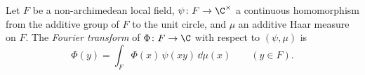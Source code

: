 Let $F$ be a non-archimedean local field, $\psi\colon F\to\C^\times$ a continuous homomorphism from the additive group
of $F$ to the unit circle, and $\mu$ an additive Haar measure on $F$. The \emph{Fourier transform} of
$\Phi\colon F\to\C$ with respect to $(\psi,\mu)$ is
\[
  \hat\Phi(y)=\int_F\Phi(x)\,\psi(xy)\,\dd\mu(x)\qquad(y\in F).
\]
